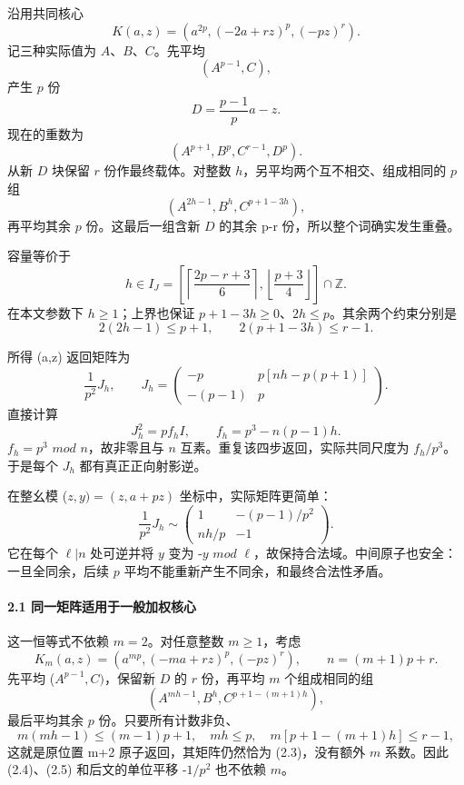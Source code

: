 \documentclass[11pt,a4paper]{article}
\theoremstyle{definition}
\numberwithin{equation}{section}
\begin{document}
{沿用共同核心} \[
K(a,z)=(a^{2p},(-2a+rz)^p,(-pz)^r).
\] {记三种实际值为} {\ensuremath{A}、\ensuremath{B}、\ensuremath{C}。先平均} \[
(A^{p-1},C),
\] {产生} {\ensuremath{p}} {份} \[
D=\frac{p-1}{p}a-z.
\] {现在的重数为} \[
(A^{p+1},B^p,C^{r-1},D^p).
\] {从新} {\ensuremath{D}} {块保留} {\ensuremath{r}} {份作最终载体。对整数} {\ensuremath{h}，另平均两个互不相交、组成相同的} {\ensuremath{p}} {组} \[
(A^{2h-1},B^h,C^{p+1-3h}),
\tag{C27.2.1}
\] {再平均其余} {\ensuremath{p}} {份。这最后一组含新} {\ensuremath{D}} {的其余} {p-r} {份，所以整个词确实发生重叠。}

{容量等价于} \[
\boxed{
h\in I_J=
\left[
\left\lceil\frac{2p-r+3}{6}\right\rceil,
\left\lfloor\frac{p+3}{4}\right\rfloor
\right]\cap\mathbb Z.}
\tag{C27.2.2}
\] {在本文参数下} {\ensuremath{h\ge 1}；上界也保证} {\ensuremath{p+1-3h\ge 0}、\ensuremath{2h\le p}。其余两个约束分别是} \[
2(2h-1)\le p+1,\qquad2(p+1-3h)\le r-1.
\]

{所得} {(a,z)} {返回矩阵为} \[
\frac1{p^2}J_h,\qquad
J_h=
\begin{pmatrix}
-p&p[nh-p(p+1)]\\
-(p-1)&p
\end{pmatrix}.
\tag{C27.2.3}
\] {直接计算} \[
\boxed{J_h^2=p f_h I,\qquad
f_h=p^3-n(p-1)h.}
\tag{C27.2.4}
\] {\ensuremath{f_{h}=p^{3}}} {\ensuremath{mod}} {\ensuremath{n}，故非零且与} {\ensuremath{n}} {互素。重复该四步返回，实际共同尺度为} {\ensuremath{f_{h}/p^{3}}。于是每个} {\ensuremath{J_{h}}} {都有真正正向射影逆。}

{在整幺模} {(\ensuremath{z,y)=(z,a+pz)}} {坐标中，实际矩阵更简单：} \[
\frac1{p^2}J_h\sim
\begin{pmatrix}
1&-(p-1)/p^2\\
nh/p&-1
\end{pmatrix}.
\tag{C27.2.5}
\] {它在每个} {\ensuremath{\ell |n}} {处可逆并将} {\ensuremath{y}} {变为} {-\ensuremath{y}} {\ensuremath{mod}} {\ensuremath{\ell }，故保持合法域。中间原子也安全：一旦全同余，后续} {\ensuremath{p}} {平均不能重新产生不同余，和最终合法性矛盾。}

\paragraph*{\texorpdfstring{{2.1} {同一矩阵适用于一般加权核心}}{2.1 同一矩阵适用于一般加权核心}}\label{C27-h169}

{这一恒等式不依赖} {\ensuremath{m=2}。对任意整数} {\ensuremath{m\ge 1}，考虑} \[
K_m(a,z)=(a^{mp},(-ma+rz)^p,(-pz)^r),\qquad n=(m+1)p+r.
\] {先平均} {(\ensuremath{A^{p-1},C)}，保留新} {\ensuremath{D}} {的} {\ensuremath{r}} {份，再平均} {\ensuremath{m}} {个组成相同的组} \[
(A^{mh-1},B^h,C^{p+1-(m+1)h}),
\] {最后平均其余} {\ensuremath{p}} {份。只要所有计数非负、} \[
m(mh-1)\le(m-1)p+1,\quad mh\le p,\quad
m[p+1-(m+1)h]\le r-1,
\tag{C27.2.6}
\] {这就是原位置} {m+2} {原子返回，其矩阵仍然恰为} {(2.3)，没有额外} {\ensuremath{m}} {系数。因此} {(2.4)、(2.5)} {和后文的单位平移} {-\ensuremath{1/p^{2}}} {也不依赖} {\ensuremath{m}。}
\end{document}
